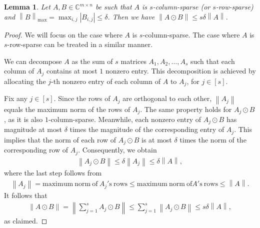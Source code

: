 \documentclass[superscriptaddress,onecolumn,nofootinbib,longbibliography,a4paper,accepted=2026-09-29]{quantumarticle}
\theoremstyle{plain}
\newtheorem{lemma}[thm]{Lemma}
\theoremstyle{definition}
\numberwithin{thm}{section}
\numberwithin{assumption}{section}
\numberwithin{lemma}{section}
\numberwithin{prop}{section}
\numberwithin{cor}{section}
\numberwithin{definition}{section}
\numberwithin{rmk}{section}
\numberwithin{equation}{section}
\newcommand{\abs}[1]      {\left| #1 \right|}
\newcommand{\norm}[1]     {\left\| #1 \right\|}
\newcommand{\myC}{\mathbb{C}}
\begin{document}
\begin{lemma}
    Let $A,B \in \myC^{m \times n}$ be such that $A$ is $s$-column-sparse (or $s$-row-sparse) and $\norm{B}_{\mathrm{max}} =\max_{i,j} \abs{B_{i,j}} \le \delta$. Then we have $\norm{A \odot B} \le s\delta \norm{A}.$
\label{lem:hadamard_prod_norm_bound}
\end{lemma}
\begin{proof}
We will focus on the case where \( A \) is \( s \)-column-sparse. The case where \( A \) is \( s \)-row-sparse can be treated in a similar manner.

We can decompose $A$ as the sum of $s$ matrices $A_1, A_2, \dots, A_s$ such that each column of $A_j$ contains at most $1$ nonzero entry. This decomposition is achieved by allocating the $j$-th nonzero entry of each column of $A$ to $A_j$, for $j \in [s]$. 

Fix any $j \in [s]$. Since the rows of $A_j$ are orthogonal to each other, $\norm{A_j}$ equals the maximum norm of the rows of $A_j$. The same property  holds for $A_j \odot B$, as it is also $1$-column-sparse. Meanwhile, each nonzero entry of $A_j \odot B$ has magnitude at most $\delta$ times the magnitude of the corresponding entry of $A_j$. This implies that the norm of each row of $A_j \odot B$ is at most $\delta$ times the norm of the corresponding row of $A_j$. Consequently, we obtain 
\begin{align}
    \norm{A_j \odot B} \le \delta \norm{A_j} \le \delta \norm{A},    
\end{align}
where the last step follows from 
\begin{align}
    \norm{A_j}=\mathrm{maximum~norm~of~}A_j\mathrm{'s~rows} \le \mathrm{maximum~norm~of}A\mathrm{'s~rows} \le \norm{A}.    
\end{align}
It follows that
\begin{align}
    \norm{A \odot B} = \norm{\sum_{j=1}^s A_j \odot B}
    \le \sum_{j=1}^s \norm{A_j \odot B} \le s\delta \norm{A},
\end{align}
as claimed.
\end{proof}
\end{document}
